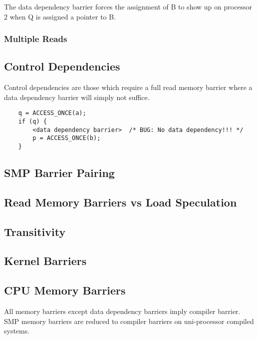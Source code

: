 \documentclass{article}
\begin{document}
The data dependency barrier forces the assignment of B to show up on
processor 2 when Q is assigned a pointer to B.

\subsubsection{Multiple Reads}


\subsection{Control Dependencies}

Control dependencies are those which require a full read memory
barrier where a data dependency barrier will simply not suffice.

\begin{lstlisting}
  	q = ACCESS_ONCE(a);
	if (q) {
		<data dependency barrier>  /* BUG: No data dependency!!! */
		p = ACCESS_ONCE(b);
	}

\end{lstlisting}




\subsection{SMP Barrier Pairing}

\subsection{Read Memory Barriers vs Load Speculation}

\subsection{Transitivity}


\subsection{Kernel Barriers}


\subsection{CPU Memory Barriers}

All memory barriers except data dependency barriers imply compiler
barrier. SMP memory barriers are reduced to compiler barriers on
uni-processor compiled systems. 
\end{document}
